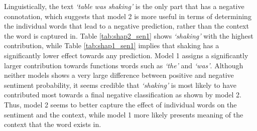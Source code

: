 Linguistically, the text \textit{`table was shaking'} is the only part that has a negative connotation, which suggests that model 2 is more useful in terms of determining the individual words that lead to a negative prediction, rather than the context the word is captured in. Table \ref{tab:shap2_sen1} shows \textit{`shaking'} with the highest contribution, while Table \ref{tab:shap1_sen1} implies that shaking has a significantly lower effect towards any prediction. Model 1 assigns a significantly larger contribution towards functions words such as \textit{`the'} and \textit{`was'}. Although neither models shows a very large difference between positive and negative sentiment probability, it seems credible that \textit{`shaking'} is most likely to have contributed most towards a final negative classification as shown by model 2. Thus, model 2 seems to better capture the effect of individual words on the sentiment and the context, while model 1 more likely presents meaning of the context that the word exists in.

